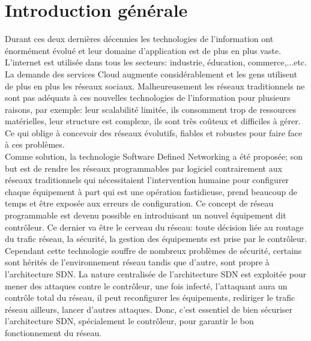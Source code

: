 
\chapter{Introduction générale} 

\label{Introduction} 
Durant ces deux dernières décennies les technologies de l’information ont  énormément évolué et leur domaine d’application est de plus en plus vaste. L’internet est utilisée dans tous les secteurs: industrie, éducation, commerce,...etc. La demande des services Cloud augmente considérablement et les gens utilisent de plus en plus les réseaux sociaux. Malheureusement les réseaux traditionnels ne sont pas adéquats à ces nouvelles technologies de l’information  pour plusieurs raisons, par exemple: leur scalabilité limitée, ils consomment trop de ressources matérielles,  leur structure est complexe, ils sont très coûteux et difficiles à gérer.  Ce qui oblige à concevoir des réseaux évolutifs, fiables et robustes pour faire face à ces problèmes.\\

	Comme solution, la technologie Software Defined Networking a été proposée; son but est de rendre les réseaux programmables par logiciel contrairement aux réseaux traditionnels qui nécessitaient l’intervention humaine  pour configurer chaque équipement à part qui est une opération fastidieuse, prend beaucoup de temps et être exposée aux erreurs de configuration. Ce concept de réseau programmable est devenu possible en introduisant un nouvel équipement dit contrôleur. Ce dernier va être le cerveau du réseau: toute décision liée au routage du trafic réseau, la sécurité, la gestion des équipements est prise par le contrôleur.\\
	
	Cependant cette technologie souffre de nombreux problèmes de sécurité, certains sont hérités de l’environnement réseau tandis que d’autre, sont propre à l’architecture SDN. La nature centralisée de l’architecture SDN est exploitée pour mener des attaques contre le contrôleur, une fois infecté, l’attaquant aura un contrôle total du réseau, il peut reconfigurer les équipements, rediriger le trafic réseau ailleurs, lancer d’autres attaques. Donc, c'est essentiel de bien sécuriser l'architecture SDN, spécialement le contrôleur, pour garantir le bon fonctionnement du réseau.\\
	
